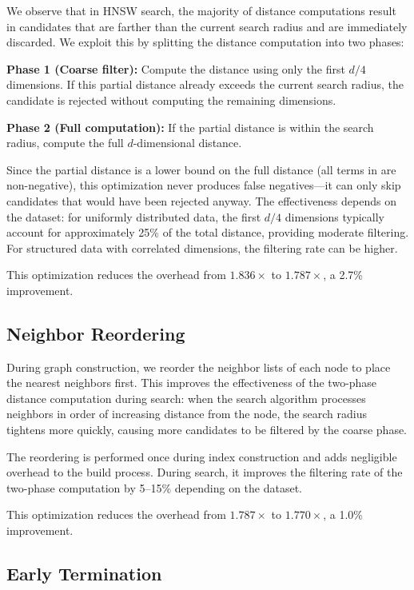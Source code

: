 \documentclass[10pt,journal,compsoc]{IEEEtran}
\newcommand{\hnsw}{\textsc{HNSW}}
\begin{document}
We observe that in \hnsw{} search, the majority of distance computations result in candidates that are farther than the current search radius and are immediately discarded. We exploit this by splitting the distance computation into two phases:

\textbf{Phase 1 (Coarse filter):} Compute the distance using only the first $d/4$ dimensions. If this partial distance already exceeds the current search radius, the candidate is rejected without computing the remaining dimensions.

\textbf{Phase 2 (Full computation):} If the partial distance is within the search radius, compute the full $d$-dimensional distance.

Since the partial distance is a lower bound on the full distance (all terms in  are non-negative), this optimization never produces false negatives---it can only skip candidates that would have been rejected anyway. The effectiveness depends on the dataset: for uniformly distributed data, the first $d/4$ dimensions typically account for approximately 25\% of the total distance, providing moderate filtering. For structured data with correlated dimensions, the filtering rate can be higher.

This optimization reduces the overhead from $1.836\times$ to $1.787\times$, a 2.7\% improvement.

\subsection{Neighbor Reordering}

During graph construction, we reorder the neighbor lists of each node to place the nearest neighbors first. This improves the effectiveness of the two-phase distance computation during search: when the search algorithm processes neighbors in order of increasing distance from the node, the search radius tightens more quickly, causing more candidates to be filtered by the coarse phase.

The reordering is performed once during index construction and adds negligible overhead to the build process. During search, it improves the filtering rate of the two-phase computation by 5--15\% depending on the dataset.

This optimization reduces the overhead from $1.787\times$ to $1.770\times$, a 1.0\% improvement.

\subsection{Early Termination}
\end{document}
